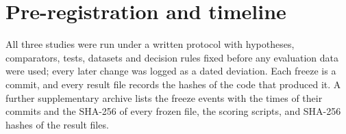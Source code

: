 

\FloatBarrier


\FloatBarrier
\section{Pre-registration and timeline}\label{app:prereg}
All three studies were run under a written protocol with hypotheses, comparators, tests, datasets and decision rules fixed
before any evaluation data were used; every later change was logged as a dated deviation. Each freeze is a commit, and
every result file records the hashes of the code that produced it. A further supplementary archive lists the freeze events
with the times of their commits and the SHA-256 of every frozen file, the scoring scripts, and SHA-256 hashes of the
result files.

